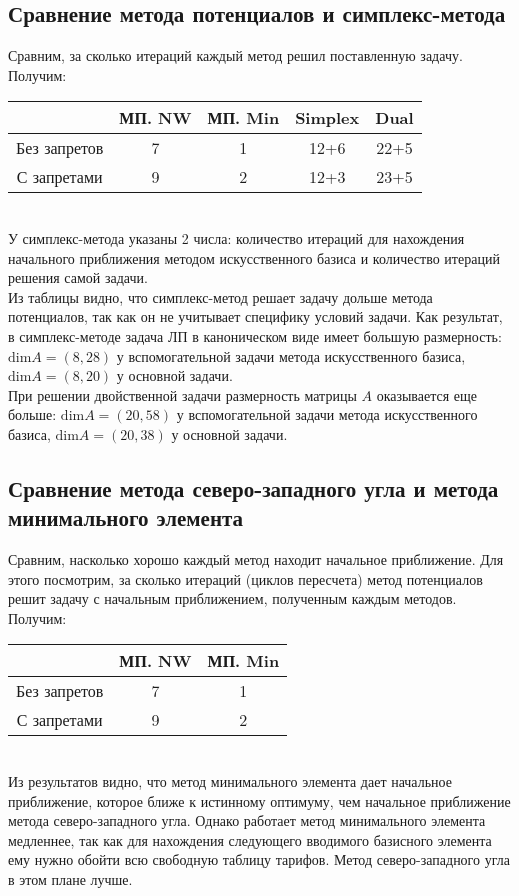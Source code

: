 \subsection{Сравнение метода потенциалов и симплекс-метода}
Сравним, за сколько итераций каждый метод решил поставленную задачу. Получим: \\
\begin{table}[!ht]
	\centering
		\begin{tabular} {|c|c|c|c|c|}
			\hline
			 & МП. NW & МП. Min & Simplex & Dual \\ \hline
			 Без запретов & 7 & 1 & 12+6 & 22+5 \\ \hline
			 С запретами & 9 & 2 & 12+3 & 23+5 \\ \hline
		\end{tabular}
\end{table} \\
У симплекс-метода указаны 2 числа: количество итераций для нахождения начального приближения методом искусственного базиса и количество итераций решения самой задачи. \\
Из таблицы видно, что симплекс-метод решает задачу дольше метода потенциалов, так как он не учитывает специфику условий задачи. Как результат, в симплекс-методе задача ЛП в каноническом виде имеет большую размерность: $\text{dim}A=(8,28)$ у вспомогательной задачи метода искусственного базиса, $\text{dim}A=(8,20)$ у основной задачи. \\
При решении двойственной задачи размерность матрицы $A$ оказывается еще больше: $\text{dim}A=(20,58)$ у вспомогательной задачи метода искусственного базиса, $\text{dim}A=(20,38)$ у основной задачи. 

\subsection{Сравнение метода северо-западного угла и метода минимального элемента}
Сравним, насколько хорошо каждый метод находит начальное приближение. Для этого посмотрим, за сколько итераций (циклов пересчета) метод потенциалов решит задачу с начальным приближением, полученным каждым методов. Получим: \\
\begin{table}[!ht]
	\centering
		\begin{tabular} {|c|c|c|}
			\hline
			 & МП. NW & МП. Min \\ \hline
			 Без запретов & 7 & 1 \\ \hline
			 С запретами & 9 & 2 \\ \hline
		\end{tabular}
\end{table} \\
Из результатов видно, что метод минимального элемента дает начальное приближение, которое ближе к истинному оптимуму, чем начальное приближение метода северо-западного угла. Однако работает метод минимального элемента медленнее, так как для нахождения следующего вводимого базисного элемента ему нужно обойти всю свободную таблицу тарифов. Метод северо-западного угла в этом плане лучше.


